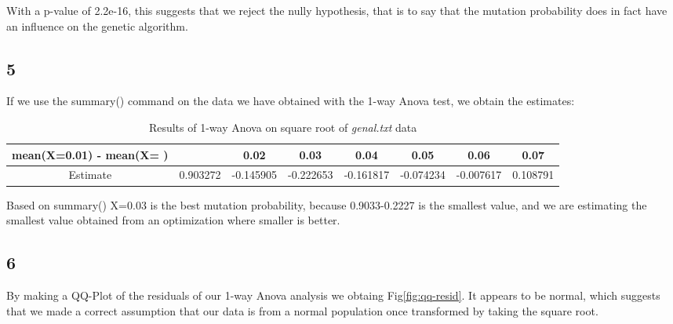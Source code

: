 \documentclass{article}
\begin{document}
    With a p-value of 2.2e-16, this suggests that we reject the nully hypothesis, that is to say that the mutation probability does in fact have an influence on the genetic algorithm.
    
    \subsection*{5}
    If we use the summary() command on the data we have obtained with the 1-way Anova test, we obtain the estimates:
    \begin{table}[H]
    \begin{center}
    \begin{tabular}{c|c|c|c|c|c|c|c|}
        \hline 
        mean(X=0.01) - mean(X= ) &  & 0.02 & 0.03 & 0.04 & 0.05 & 0.06 & 0.07 \\
        \hline
        Estimate & 0.903272 & -0.145905 & -0.222653 & -0.161817 & -0.074234 & -0.007617 & 0.108791 \\
        \hline
    \end{tabular}
    \caption{Results of 1-way Anova on square root of \textit{genal.txt} data}
    \label{table:1anova}
    \end{center}
    \end{table}
    
    Based on summary() X=0.03 is the best mutation probability, because 0.9033-0.2227 is the smallest value, and we are estimating the smallest value obtained from an optimization where smaller is better.
    
    \subsection*{6}
    By making a QQ-Plot of the residuals of our 1-way Anova analysis we obtaing Fig\ref{fig:qq-resid}. It appears to be normal, which suggests that we made a correct assumption that our data is from a normal population once transformed by taking the square root.
    
\end{document}

